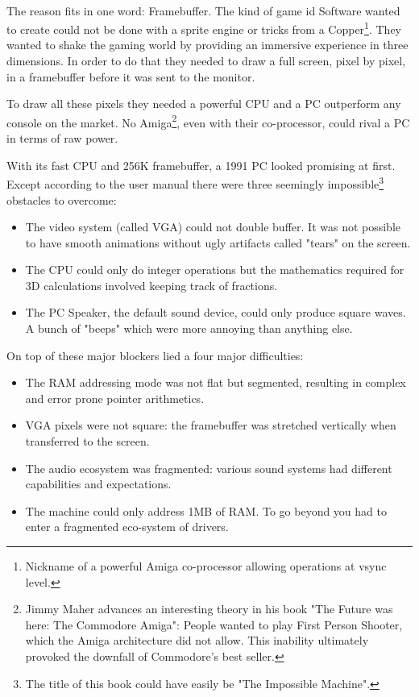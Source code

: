 \\
The reason fits in one word: Framebuffer. The kind of game id Software wanted to create could not be done with a sprite engine or tricks from a Copper\footnote{Nickname of a powerful Amiga co-processor allowing operations at vsync level.}. They wanted to shake the gaming world by providing an immersive experience in three dimensions. In order to do that they needed to draw a full screen, pixel by pixel, in a framebuffer before it was sent to the monitor. \\
\par
To draw all these pixels they needed a powerful CPU and a PC outperform any console on the market. No Amiga\footnote{Jimmy Maher advances an interesting theory in his book "The Future was here: The Commodore Amiga": People wanted to play First Person Shooter, which the Amiga architecture did not allow. This inability ultimately provoked the downfall of Commodore's best seller.}, even with their co-processor, could rival a PC in terms of raw power.
\par


 
With its fast CPU and 256K framebuffer, a 1991 PC looked promising at first. Except according to the user manual there were three seemingly impossible\footnote{The title of this book could have easily be "The Impossible Machine".} obstacles to overcome:\\
\begin{itemize}
\item The video system (called VGA) could not double buffer. It was not possible to have smooth animations without ugly artifacts called "tears" on the screen.
\item The CPU could only do integer operations but the mathematics required for 3D calculations involved keeping track of fractions.
\item The PC Speaker, the default sound device, could only produce square waves. A bunch of "beeps" which were more annoying than anything else.
\end{itemize}
On top of these major blockers lied a four major difficulties:\\
\begin{itemize}
\item The RAM addressing mode was not flat but segmented, resulting in complex and error prone pointer arithmetics.
\item VGA pixels were not square: the framebuffer was stretched vertically when
transferred to the screen.
\item The audio ecosystem was fragmented: various sound systems had different capabilities and expectations.
\item The machine could only address 1MB of RAM. To go beyond you had to enter a fragmented eco-system of drivers.
\end{itemize}

